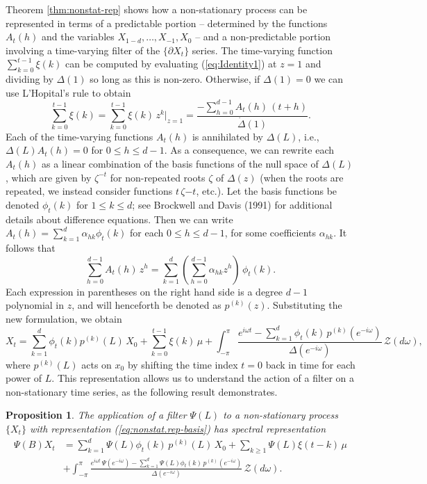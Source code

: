 \documentclass[a4paper]{book}
\newtheorem{Proposition}{Proposition}
\begin{document}
  Theorem  \ref{thm:nonstat-rep} shows how a non-stationary process
  can be represented in  terms of a predictable
  portion -- determined by the functions $A_{t} (h)$ and the
  variables $X_{1-d}, \ldots, X_{-1}, X_0$ -- and a
  non-predictable portion involving a time-varying filter of the $\{
  \partial X_t \}$ series. 
  The time-varying function $\sum_{k=0}^{t-1} \xi (k)$ can be computed
  by evaluating (\ref{eq:Identity1}) at $z=1$ and dividing by $\Delta (1)$
   so long as this is non-zero.  Otherwise, if $\Delta (1) = 0$ we can
   use L'Hopital's rule to obtain
  \[
   \sum_{k=0}^{t-1} \xi (k) = \sum_{k=0}^{t-1} \xi (k) \, z^k \vert_{z = 1}
   = \frac{ - \sum_{h=0}^{d-1} A_t (h) \, (t+h) }{ \dot{\Delta} (1)}.
  \]
     Each of the time-varying functions $A_t (h)$ is annihilated
 by $\Delta (L)$, i.e., $\Delta (L) A_{t} (h) = 0$ for $0 \leq
 h \leq d-1$.   As a consequence, we can rewrite each $A_{t} (h)$ as a linear
 combination of the basis functions of the null space of $\Delta
 (L)$, which are given by $\zeta^{-t}$ for non-repeated roots $\zeta$
  of $\Delta (z)$ (when the roots are repeated, we instead consider
  functions $t \, \zeta{-t}$, etc.).  
    Let the basis  functions be denoted
    $\phi_t (k) $ for $1 \leq k \leq d$; see Brockwell and Davis (1991)
     for additional details about difference equations.  Then we can
 write $A_{t} (h) = \sum_{k=1}^d \alpha_{hk} \phi_t (k)$ for each $0 \leq
 h \leq d-1$, for some coefficients $\alpha_{hk}$.  It follows that
\[
 \sum_{h=0}^{d-1} A_{t}(h) \, z^h = \sum_{k=1}^d \left(
 \sum_{h=0}^{d-1} \alpha_{hk} z^h \right)  \, \phi_t (k).
\]
 Each expression in parentheses on the right hand side is a degree
 $d-1$ polynomial in $z$, and will henceforth be denoted as $p^{(k)}
 (z)$.   Substituting the new formulation, we obtain
\begin{equation}
\label{eq:nonstat.rep-basis}
 X_t = \sum_{k=1}^d \phi_t (k) p^{(k)} (L) \, X_{0} + 
  \sum_{k=0}^{t-1} \xi (k) \, \mu  +  \int_{-\pi}^{\pi}
 \frac{ e^{i \omega t} - \sum_{k=1}^d \phi_t (k) \, 
 p^{(k)} ( e^{-i \omega  } )}{ \Delta (e^{-i \omega}) } \,  \mathcal{Z}  (d\omega),
\end{equation}
 where $p^{(k)} (L)$ acts on $x_0$ by shifting the time index $t=0$
 back in time for each power of $L$.  
  This representation allows us to 
  understand the action of a filter on a non-stationary time series,
  as the following result demonstrates.
  
\begin{Proposition}
  \label{prop:filter-nonstat}
  The application of a filter $\Psi (L)$ to a non-stationary process $\{ X_t \}$
  with representation  (\ref{eq:nonstat.rep-basis}) has spectral representation
 \begin{align*}
 \Psi (B) X_t & =   \sum_{k=1}^d \Psi (L) \phi_t (k) \, p^{(k)} (L) \, X_{0}  +
   \sum_{k \geq 1}  \Psi (L)  \xi (t-k) \, \mu \\
   & +   \int_{-\pi}^{\pi}
   \frac{ e^{i \omega t} \, \Psi (e^{-i \omega}) 
   - \sum_{k=1}^d \Psi (L) \phi_t (k) \, p^{(k)} (e^{-i \omega}) 
    }{ \Delta (e^{-i \omega}) } \, \mathcal{Z}  (d\omega).
 \end{align*}
 \end{Proposition}
  
\end{document}
